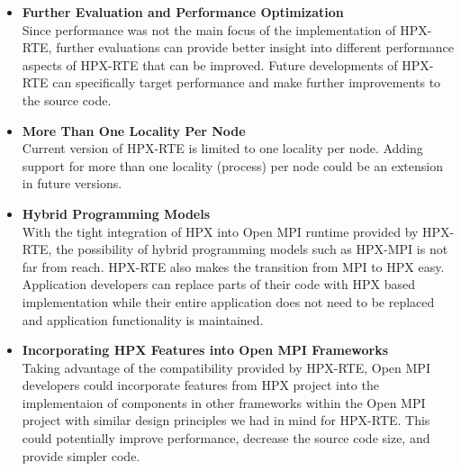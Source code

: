 \begin{itemize}

\item \textbf{Further Evaluation and Performance Optimization}\\
Since performance was not the main focus of the implementation of HPX-RTE, further evaluations can provide better insight into different performance aspects of HPX-RTE that can be improved. Future developments of HPX-RTE can specifically target performance and make further improvements to the source code. 

\item \textbf{More Than One Locality Per Node}\\
Current version of HPX-RTE is limited to one locality per node. Adding support for more than one locality (process) per node could be an extension in future versions.

\item \textbf{Hybrid Programming Models}\\
With the tight integration of HPX into Open MPI runtime provided by HPX-RTE, the possibility of hybrid programming models such as HPX-MPI is not far from reach. HPX-RTE also makes the transition from MPI to HPX easy. Application developers can replace parts of their code with HPX based implementation while their entire application does not need to be replaced and application functionality is maintained.

\item \textbf{Incorporating HPX Features into Open MPI Frameworks}\\
Taking advantage of the compatibility provided by HPX-RTE, Open MPI developers could incorporate features from HPX project into the implementaion of components in other frameworks within the Open MPI project with similar design principles we had in mind for HPX-RTE. This could potentially improve performance, decrease the source code size, and provide simpler code.    
\end{itemize}


